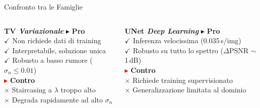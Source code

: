 \documentclass[italian,10pt]{beamer}
\begin{document}
\begin{frame}{Confronto tra le Famiglie}
  \begin{columns}[t]
      {%
      \begin{block}{\small\bfseries TV  \hfill \scriptsize\itshape Variazionale}
        \scriptsize
        \textcolor{green!50!black}{$\blacktriangleright$} \textbf{Pro}\\[0.05cm]
        \hspace{0.3cm}$\checkmark$ Non richiede dati di training\\
        \hspace{0.3cm}$\checkmark$ Interpretabile, soluzione unica\\
        \hspace{0.3cm}$\checkmark$ Robusto a basso rumore ($\sigma_n \leq 0.01$)\\[0.08cm]
        \textcolor{red}{$\blacktriangleright$} \textbf{Contro}\\[0.05cm]
        \hspace{0.3cm}$\times$ Staircasing a $\lambda$ troppo alto\\
        \hspace{0.3cm}$\times$ Degrada rapidamente ad alto $\sigma_n$
      \end{block}}

      {%
      \begin{block}{\small\bfseries UNet  \hfill \scriptsize\itshape Deep Learning}
        \scriptsize
        \textcolor{green!50!black}{$\blacktriangleright$} \textbf{Pro}\\[0.05cm]
        \hspace{0.3cm}$\checkmark$ Inferenza velocissima (0.035\,s/img)\\
        \hspace{0.3cm}$\checkmark$ Robusto su tutto lo spettro ($\Delta$PSNR $\sim$1\,dB)\\[0.08cm]
        \textcolor{red}{$\blacktriangleright$} \textbf{Contro}\\[0.05cm]
        \hspace{0.3cm}$\times$ Richiede training supervisionato\\
        \hspace{0.3cm}$\times$ Generalizzazione limitata al dominio
      \end{block}}
  \end{columns}


\end{frame}
\end{document}
